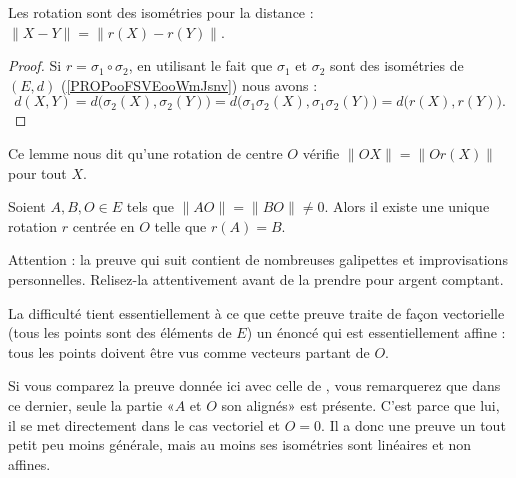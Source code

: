\begin{lemma}       \label{LEMooTZNWooTVOklu}
    Les rotation sont des isométries pour la distance : \( \| X-Y \|=\| r(X)-r(Y) \|\).
\end{lemma}

\begin{proof}
    Si \( r=\sigma_1\circ\sigma_2\), en utilisant le fait que \( \sigma_1\) et \( \sigma_2\) sont des isométries de \( (E,d)\) (\ref{PROPooFSVEooWmJsnv}) nous avons :
    \begin{equation}
        d(X,Y)=d\big( \sigma_2(X),\sigma_2(Y) \big)=d\big( \sigma_1\sigma_2(X),\sigma_1\sigma_2(Y) \big)=d\big( r(X),r(Y) \big).
    \end{equation}
\end{proof}

Ce lemme nous dit qu'une rotation de centre \( O\) vérifie \( \| OX \|=\| Or(X) \|\) pour tout \( X\).

\begin{proposition}      \label{PROPooNXJKooEDOczh}
    Soient \( A,B,O\in E\) tels que \( \| AO \|=\| BO \|\neq 0\). Alors il existe une unique rotation \( r\) centrée en \( O\) telle que \( r(A)=B\).
\end{proposition}

\begin{probleme}
    Attention : la preuve qui suit contient de nombreuses galipettes et improvisations personnelles. Relisez-la attentivement avant de la prendre pour argent comptant.

    La difficulté tient essentiellement à ce que cette preuve traite de façon vectorielle (tous les points sont des éléments de \( E\)) un énoncé qui est essentiellement affine : tous les points doivent être vus comme vecteurs partant de \( O\).

    Si vous comparez la preuve donnée ici avec celle de \cite{ooYPVPooYGSlNU}, vous remarquerez que dans ce dernier, seule la partie «\( A\) et \( O\) son alignés» est présente. C'est parce que lui, il se met directement dans le cas vectoriel et \( O=0\). Il a donc une preuve un tout petit peu moins générale, mais au moins ses isométries sont linéaires et non affines.
\end{probleme}

